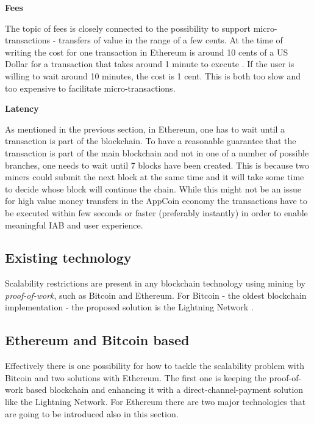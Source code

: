 \medskip

{\bf Fees}

The topic of fees is closely connected to the possibility to support micro-transactions - transfers of value in the range of a few cents. At the time of writing the cost for one transaction in Ethereum is around 10 cents of a US Dollar for a transaction that takes around 1 minute to execute \cite{ethgasstation}. If the user is willing to wait around 10 minutes, the cost is 1 cent. This is both too slow and too expensive to facilitate micro-transactions.

\medskip

{\bf Latency}

As mentioned in the previous section, in Ethereum, one has to wait until a transaction is part of the blockchain. To have a reasonable guarantee that the transaction is part of the main blockchain and not in one of a number of possible branches, one needs to wait until 7 blocks have been created. This is because two miners could submit the next block at the same time and it will take some time to decide whose block will continue the chain. While this might not be an issue for high value money transfers in the AppCoin economy the transactions have to be executed within few seconds or faster (preferably instantly) in order to enable meaningful IAB and user experience.

\subsection{Existing technology}

Scalability restrictions are present in any blockchain technology using mining by \textit{proof-of-work}, such as Bitcoin and Ethereum. For Bitcoin - the oldest blockchain implementation - the proposed solution is the Lightning Network \cite{LighthingNetwork}.


\subsection{Ethereum and Bitcoin based}

Effectively there is one possibility for how to tackle the scalability problem with Bitcoin and two solutions with Ethereum. The first one is keeping the proof-of-work based blockchain and enhancing it with a direct-channel-payment solution like the Lightning Network. For Ethereum there are two major technologies that are going to be introduced also in this section.

